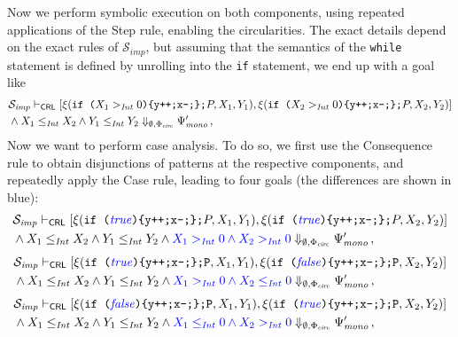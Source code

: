 Now we perform symbolic execution on both components, using repeated applications of the Step rule,
enabling the circularities.
The exact details depend on the exact rules of $\mathcal{S}_{\mathit{imp}}$, but assuming that the semantics of
the \texttt{while} statement is defined by unrolling into the \texttt{if} statement,
we end up with a goal like
\begin{align*}
  & \mathcal{S}_{\mathit{imp}} \vdash_{\mathsf{CRL}}
  [ \xi(\texttt{if (}X_1 >_{\mathit{Int}} 0 \texttt{)\{y++;x--;\};}P, X_1, Y_1),  
    \xi(\texttt{if (}X_2 >_{\mathit{Int}} 0 \texttt{)\{y++;x--;\};}P, X_2, Y_2) ] \\
  & \land X_1 \leq_{\mathit{Int}} X_2 \land Y_1 \leq_{\mathit{Int}} Y_2
  \Downarrow_{\emptyset, \Phi_{\mathit{circ}}} \Psi^\prime_{\mathit{mono}} \, ,
\end{align*}
Now we want to perform case analysis. To do so, we first use the Consequence rule to
obtain disjunctions of patterns at the respective components, and repeatedly apply the Case rule, leading to four goals
(the differences are shown in {\color{blue}blue}):
\begin{equation}\label{ex:case1}
\begin{aligned}
  & \mathcal{S}_{\mathit{imp}} \vdash_{\mathsf{CRL}}
  [ \xi(\texttt{if (}{\color{blue}\mathit{true}}\texttt{)\{y++;x--;\};}P, X_1, Y_1),  
    \xi(\texttt{if (}{\color{blue}\mathit{true}}\texttt{)\{y++;x--;\};}P, X_2, Y_2) ] \\
  & \land X_1 \leq_{\mathit{Int}} X_2 \land Y_1 \leq_{\mathit{Int}} Y_2 \land {\color{blue} X_1 >_{\mathit{Int}} 0 \land X_2 >_{\mathit{Int}} 0 }
  \Downarrow_{\emptyset, \Phi_{\mathit{circ}}} \Psi^\prime_{\mathit{mono}} \, ,
\end{aligned}
\end{equation}
\begin{equation}\label{ex:case2}
\begin{aligned}
  & \mathcal{S}_{\mathit{imp}} \vdash_{\mathsf{CRL}}
  [ \xi(\texttt{if (}{\color{blue}\mathit{true}}\texttt{)\{y++;x--;\};P}, X_1, Y_1),  
    \xi(\texttt{if (}{\color{blue}\mathit{false}}\texttt{)\{y++;x--;\};P}, X_2, Y_2) ] \\
  & \land X_1 \leq_{\mathit{Int}} X_2 \land Y_1 \leq_{\mathit{Int}} Y_2 \land {\color{blue} X_1 >_{\mathit{Int}} 0 \land X_2 \leq_{\mathit{Int}} 0 }
  \Downarrow_{\emptyset, \Phi_{\mathit{circ}}} \Psi^\prime_{\mathit{mono}} \, ,
\end{aligned}
\end{equation}
\begin{equation}\label{ex:case3}
\begin{aligned}
  & \mathcal{S}_{\mathit{imp}} \vdash_{\mathsf{CRL}}
  [ \xi(\texttt{if (}{\color{blue}\mathit{false}}\texttt{)\{y++;x--;\};P}, X_1, Y_1),  
    \xi(\texttt{if (}{\color{blue}\mathit{true}}\texttt{)\{y++;x--;\};P}, X_2, Y_2) ] \\
  & \land X_1 \leq_{\mathit{Int}} X_2 \land Y_1 \leq_{\mathit{Int}} Y_2 \land {\color{blue} X_1 \leq_{\mathit{Int}} 0 \land X_2 >_{\mathit{Int}} 0 }
  \Downarrow_{\emptyset, \Phi_{\mathit{circ}}} \Psi^\prime_{\mathit{mono}} \, ,
\end{aligned}
\end{equation}
